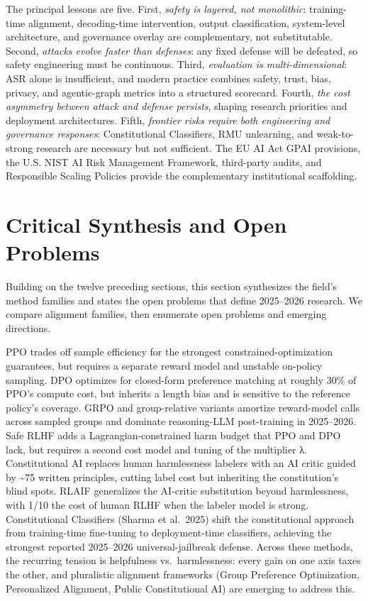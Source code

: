 The principal lessons are five. First, \emph{safety is layered, not monolithic}: training-time alignment, decoding-time intervention, output classification, system-level architecture, and governance overlay are complementary, not substitutable. Second, \emph{attacks evolve faster than defenses}: any fixed defense will be defeated, so safety engineering must be continuous. Third, \emph{evaluation is multi-dimensional}: ASR alone is insufficient, and modern practice combines safety, trust, bias, privacy, and agentic-graph metrics into a structured scorecard. Fourth, \emph{the cost asymmetry between attack and defense persists}, shaping research priorities and deployment architectures. Fifth, \emph{frontier risks require both engineering and governance responses}: Constitutional Classifiers, RMU unlearning, and weak-to-strong research are necessary but not sufficient. The EU AI Act GPAI provisions, the U.S. NIST AI Risk Management Framework, third-party audits, and Responsible Scaling Policies provide the complementary institutional scaffolding.

\section{Critical Synthesis and Open Problems}\label{critical-synthesis-and-open-problems}

Building on the twelve preceding sections, this section synthesizes the field's method families and states the open problems that define 2025--2026 research. We compare alignment families, then enumerate open problems and emerging directions.

PPO trades off sample efficiency for the strongest constrained-optimization guarantees, but requires a separate reward model and unstable on-policy sampling. DPO optimizes for closed-form preference matching at roughly 30\% of PPO's compute cost, but inherits a length bias and is sensitive to the reference policy's coverage. GRPO and group-relative variants amortize reward-model calls across sampled groups and dominate reasoning-LLM post-training in 2025--2026. Safe RLHF adds a Lagrangian-constrained harm budget that PPO and DPO lack, but requires a second cost model and tuning of the multiplier λ. Constitutional AI replaces human harmlessness labelers with an AI critic guided by \textasciitilde75 written principles, cutting label cost but inheriting the constitution's blind spots. RLAIF generalizes the AI-critic substitution beyond harmlessness, with 1/10 the cost of human RLHF when the labeler model is strong. Constitutional Classifiers (Sharma et al.~2025) shift the constitutional approach from training-time fine-tuning to deployment-time classifiers, achieving the strongest reported 2025--2026 universal-jailbreak defense. Across these methods, the recurring tension is helpfulness vs.~harmlessness: every gain on one axis taxes the other, and pluralistic alignment frameworks (Group Preference Optimization, Personalized Alignment, Public Constitutional AI) are emerging to address this.

